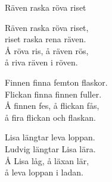 \begin{song}{Räven raska röva riset}
	
	
	
	Räven raska röva riset,\\
	riset raska rena räven.\\
	Å röva ris, å räven rös,\\
	å riva räven i röven.
	
	Finnen finna femton flaskor.\\
	Flickan finna finnen fuller.\\
	Å finnen fes, å flickan fås,\\
	å fira flickan och flaskan.
	
	Lisa längtar leva loppan.\\
	Ludvig längtar Lisa lära.\\
	Å Lisa låg, å läxan lär,\\
	å leva loppan i ladan.
	
\end{song}
